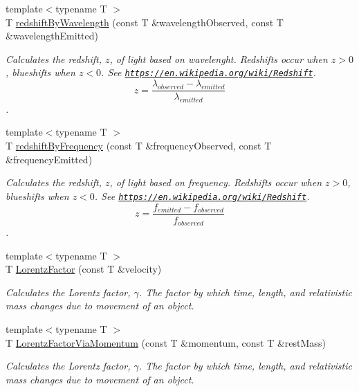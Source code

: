 \begin{DoxyCompactItemize}
{\footnotesize template$<$typename T $>$ }\\T \mbox{\hyperlink{group___e_g_x_phys-_optics_ga29300a13e34da35332ca2d447b5ce82d}{redshift\+By\+Wavelength}} (const T \&wavelength\+Observed, const T \&wavelength\+Emitted)
\begin{DoxyCompactList}\small\item\em Calculates the redshift, $z$, of light based on wavelenght. Redshifts occur when $z > 0$, blueshifts when $z < 0$. See \href{https://en.wikipedia.org/wiki/Redshift}{\tt https\+://en.\+wikipedia.\+org/wiki/\+Redshift}. \[z=\frac{\lambda_{observed}-\lambda_{emitted}}{\lambda_{emitted}}\]. \end{DoxyCompactList}\item 
{\footnotesize template$<$typename T $>$ }\\T \mbox{\hyperlink{group___e_g_x_phys-_optics_gacc6d3b2922061214d64b89a4b8e3967a}{redshift\+By\+Frequency}} (const T \&frequency\+Observed, const T \&frequency\+Emitted)
\begin{DoxyCompactList}\small\item\em Calculates the redshift, $z$, of light based on frequency. Redshifts occur when $z > 0$, blueshifts when $z < 0$. See \href{https://en.wikipedia.org/wiki/Redshift}{\tt https\+://en.\+wikipedia.\+org/wiki/\+Redshift}. \[z=\frac{f_{emitted}-f_{observed}}{f_{observed}}\]. \end{DoxyCompactList}\item 
{\footnotesize template$<$typename T $>$ }\\T \mbox{\hyperlink{group___e_g_x_phys-_lorentz_transformations_ga5f9b11c1f4c3ae26a7e64f02c22d5a75}{Lorentz\+Factor}} (const T \&velocity)
\begin{DoxyCompactList}\small\item\em Calculates the Lorentz factor, $\gamma$. The factor by which time, length, and relativistic mass changes due to movement of an object. \end{DoxyCompactList}\item 
{\footnotesize template$<$typename T $>$ }\\T \mbox{\hyperlink{group___e_g_x_phys-_lorentz_transformations_ga1ea24128654ac333dd843afdd5c003b7}{Lorentz\+Factor\+Via\+Momentum}} (const T \&momentum, const T \&rest\+Mass)
\begin{DoxyCompactList}\small\item\em Calculates the Lorentz factor, $\gamma$. The factor by which time, length, and relativistic mass changes due to movement of an object. \end{DoxyCompactList}\item 

\end{DoxyCompactItemize}

